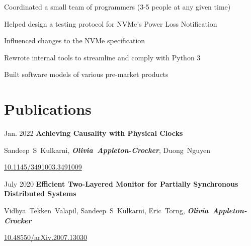 	\vspace{-0.35 cm}
	\begin{onecolentry}
		\begin{highlights}
			\item Coordinated a small team of programmers (3-5 people at any given
			time) \item Helped design a testing protocol for NVMe's Power Loss Notification
			\item Influenced changes to the NVMe specification \item Rewrote internal tools
			to streamline and comply with Python 3 \item Built software models of various
			pre-market products
		\end{highlights}
	\end{onecolentry}

	\section{Publications}

	\begin{samepage}
		\begin{twocolentry}
			{ Jan. 2022 } \textbf{Achieving Causality with Physical Clocks}
		\end{twocolentry}

		\vspace{0.10 cm}

		\begin{onecolentry}
			\mbox{Sandeep S Kulkarni},
			\mbox{\textbf{\textit{Olivia Appleton-Crocker}}}, \mbox{Duong Nguyen}

			\vspace{0.10 cm}

			\href{https://doi.org/10.1145/3491003.3491009}{10.1145/3491003.3491009}
		\end{onecolentry}
	\end{samepage}

    \vspace{0.2 cm}

	\begin{samepage}
		\begin{twocolentry}
			{ July 2020 } \textbf{Efficient Two-Layered Monitor for Partially
			Synchronous Distributed Systems}
		\end{twocolentry}

		\vspace{0.10 cm}

		\begin{onecolentry}
			\mbox{Vidhya Tekken Valapil}, \mbox{Sandeep S Kulkarni}, \mbox{Eric Torng},
			\mbox{\textbf{\textit{Olivia Appleton-Crocker}}}

			\vspace{0.10 cm}

			\href{https://doi.org/10.48550/arXiv.2007.13030}{10.48550/arXiv.2007.13030}
		\end{onecolentry}
	\end{samepage}

